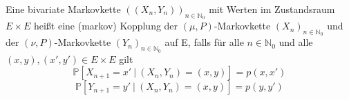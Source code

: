 Eine bivariate Markovkette $((X_{n},Y_{n}))_{n \in \mathbb{N}_{0}}$ mit Werten im Zustandsraum $E \times E$ heißt eine (markov) Kopplung der $(\mu,P)$-Markovkette $(X_{n})_{n \in \mathbb{N}_{0}}$ und der $(\nu,P)$-Markovkette $(Y_{n})_{n \in \mathbb{N}_{0}}$ auf E, falls für alle $n \in \mathbb{N}_{0}$ und alle $(x,y),(x',y') \in E \times E$ gilt
\begin{equation*}
\mathbb{P}[X_{n+1}= x' \: | \: (X_{n},Y_{n}) = (x,y)] = p(x,x')
\end{equation*}
\begin{equation*}
\mathbb{P}[Y_{n+1}= y' \: | \: (X_{n},Y_{n}) = (x,y)] = p(y,y')
\end{equation*}